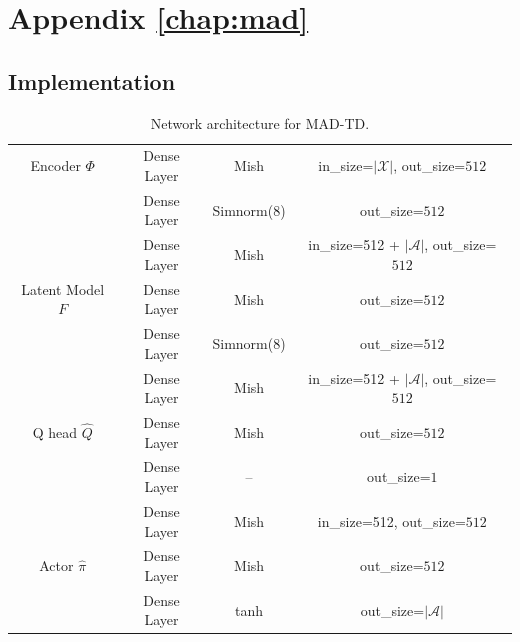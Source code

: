 \chapter{Appendix \autoref{chap:mad}}

\section{Implementation}
\label{app:implementation}

\begin{table}
\begin{center}
\begin{tabular}{c|c|c|c}
     Encoder $\Phi$ & Dense Layer & Mish & in\_size=$|\mathcal{X}|$, out\_size=$512$ \\
     & Dense Layer & Simnorm(8) & out\_size=$512$\\\hline
     
     & Dense Layer & Mish &in\_size=512 + $|\mathcal{A}|$, out\_size=$512$ \\
     Latent Model $F$ & Dense Layer & Mish & out\_size=$512$\\\
     & Dense Layer & Simnorm(8) &out\_size=$512$\\\hline
     
     & Dense Layer & Mish &in\_size=512 + $|\mathcal{A}|$, out\_size=$512$ \\
     Q head $\hat{Q}$& Dense Layer & Mish & out\_size=$512$\\
     & Dense Layer & -- & out\_size=$1$\\\hline

     & Dense Layer & Mish &in\_size=512, out\_size=$512$ \\
     Actor $\hat{\pi}$& Dense Layer & Mish & out\_size=$512$\\
     & Dense Layer & tanh & out\_size=$|\mathcal{A}|$
\end{tabular}
\end{center}
\caption{Network architecture for MAD-TD.}
\label{tab:arch}
\end{table}

